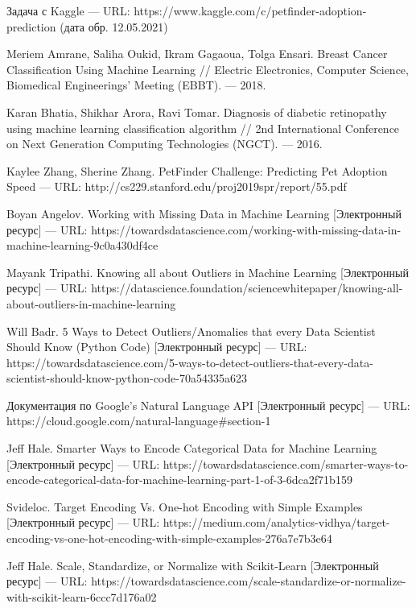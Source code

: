 \documentclass[14pt]{mmcs_article}
\begin{document}
\begin{thebibliography}{0}
Задача с Kaggle --- URL: https://www.kaggle.com/c/petfinder-adoption-prediction (дата обр. 12.05.2021)

Meriem Amrane, Saliha Oukid, Ikram Gagaoua, Tolga Ensari. Breast Cancer Classification Using Machine Learning // Electric Electronics, Computer Science, Biomedical Engineerings' Meeting (EBBT). --- 2018.

Karan Bhatia, Shikhar Arora, Ravi Tomar. Diagnosis of diabetic retinopathy using machine learning classification algorithm // 2nd International Conference on Next Generation Computing Technologies (NGCT). --- 2016.

Kaylee Zhang, Sherine Zhang. PetFinder Challenge: Predicting Pet Adoption Speed --- URL: http://cs229.stanford.edu/proj2019spr/report/55.pdf 

Boyan Angelov. Working with Missing Data in Machine Learning  [Электронный ресурс] --- URL:  https://towardsdatascience.com/working-with-missing-data-in-machine-learning-9c0a430df4ce

Mayank Tripathi. Knowing all about Outliers in Machine Learning  [Электронный ресурс] --- URL:  https://datascience.foundation/sciencewhitepaper/knowing-all-about-outliers-in-machine-learning

Will Badr. 5 Ways to Detect Outliers/Anomalies that every Data Scientist Should Know (Python Code) [Электронный ресурс] --- URL: https://towardsdatascience.com/5-ways-to-detect-outliers-that-every-data-scientist-should-know-python-code-70a54335a623

Документация по Google’s Natural Language API [Электронный ресурс] --- URL:  https://cloud.google.com/natural-language\#section-1 

Jeff Hale. Smarter Ways to Encode Categorical Data for Machine Learning  [Электронный ресурс] --- URL:  https://towardsdatascience.com/smarter-ways-to-encode-categorical-data-for-machine-learning-part-1-of-3-6dca2f71b159 

Svideloc. Target Encoding Vs. One-hot Encoding with Simple Examples  [Электронный ресурс] --- URL:  https://medium.com/analytics-vidhya/target-encoding-vs-one-hot-encoding-with-simple-examples-276a7e7b3e64

Jeff Hale. Scale, Standardize, or Normalize with Scikit-Learn [Электронный ресурс] --- URL:  https://towardsdatascience.com/scale-standardize-or-normalize-with-scikit-learn-6ccc7d176a02


\end{thebibliography}
\end{document}
